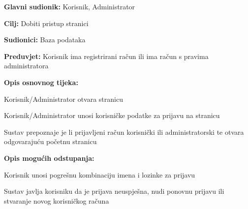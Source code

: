 					\noindent {}
					\begin{packed_item}
				
				\item \textbf{Glavni sudionik: } Korisnik, Administrator
				\item  \textbf{Cilj:} Dobiti pristup stranici
				\item  \textbf{Sudionici:} Baza podataka
				\item  \textbf{Preduvjet:} Korisnik ima registrirani račun ili ima račun s pravima administratora
				\item  \textbf{Opis osnovnog tijeka:}
				
				\item[] \begin{packed_enum}
					
					\item Korisnik/Administrator otvara stranicu
					\item Korisnik/Administrator unosi korisničke podatke za prijavu na stranicu
					\item Sustav prepoznaje je li prijavljeni račun korisnički ili administratorski te otvara odgovarajuću početnu stranicu
				\end{packed_enum}
				
				\item  \textbf{Opis mogućih odstupanja:}
				
				\item[] \begin{packed_item}
					
					\item[2.a] Korisnik unosi pogrešnu kombinaciju imena i lozinke za prijavu
					\item[] \begin{packed_enum}
						
						\item Sustav javlja korisniku da je prijava neuspješna, nudi ponovnu prijavu ili stvaranje
						novog korisničkog računa
					\end{packed_enum}
					
					
				\end{packed_item}
			\end{packed_item}
			
